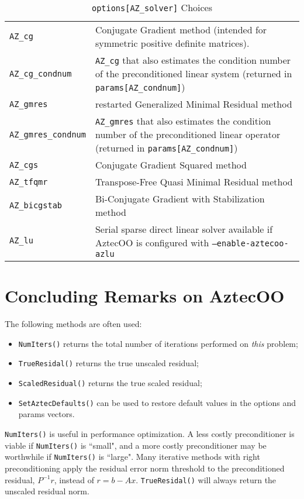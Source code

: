 \begin{table}
\begin{center}
\begin{tabular}{ | p{5cm} | p{10cm} | } \hline
\verb!AZ_cg!         & Conjugate Gradient method (intended for symmetric positive definite matrices). \\
\verb!AZ_cg_condnum! & \verb!AZ_cg! that also estimates the condition number of the preconditioned linear system
                       (returned in \verb!params[AZ_condnum]!)\\ 
\verb!AZ_gmres!      & restarted Generalized Minimal Residual method \\
\verb!AZ_gmres_condnum! & \verb!AZ_gmres! that also estimates the condition number of the preconditioned linear operator
                          (returned in \verb!params[AZ_condnum]!)\\ 
\verb!AZ_cgs! &  Conjugate Gradient Squared method\\
\verb!AZ_tfqmr! & Transpose-Free Quasi Minimal Residual method \\
\verb!AZ_bicgstab! &  Bi-Conjugate Gradient with Stabilization method\\
\verb!AZ_lu! & Serial sparse direct linear solver available if
               AztecOO is configured with {\tt --enable-aztecoo-azlu}\\
\hline \end{tabular}
\caption{ {\tt options[AZ\_solver]} Choices}
\label{tab:aztec:solver}
\end{center}
\end{table}


\section{Concluding Remarks on AztecOO}

The following methods are often used:
\begin{itemize}
\item \verb!NumIters()! returns the total number of iterations performed
  on {\sl this} problem;
\item \verb!TrueResidal()! returns the true unscaled residual;
\item \verb!ScaledResidual()! returns the true scaled residual;
\item \verb!SetAztecDefaults()! can be used to restore default values in
  the options and params vectors.
\end{itemize}
\verb!NumIters()! is useful in performance optimization.
A less costly preconditioner is viable if \verb!NumIters()! is ``small", 
and a more costly preconditioner may be worthwhile if \verb!NumIters()! is ``large".
Many iterative methods with right preconditioning 
apply the residual error norm threshold to the preconditioned residual,
$P^{-1}r$, instead of $r=b-Ax$.
\verb!TrueResidal()! will always return the unscaled residual norm.
